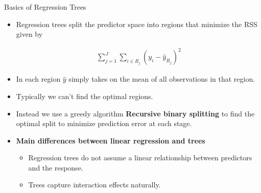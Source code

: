 \documentclass[10pt]{beamer}
\begin{document}
\begin{frame}{Basics of Regression Trees}
    \begin{itemize}
        \item Regression trees split the predictor space into regions that minimize the RSS given by

              \begin{align*}
                  \sum_{j=1}^{J} \sum_{i \in R_j} ( y_i- \hat{y}_{R_j} )^2
              \end{align*}


        \item In each region $\hat{y}$ simply takes on the mean of all observations in that region.

        \item Typically we can't find the optimal regions.
        \item Instead we use a greedy algorithm \textbf{Recursive binary splitting} to find the optimal split to minimize prediction error at each stage.

              \vspace{1cm}
        \item \textbf{Main differences between linear regression and trees}
              \begin{itemize}
                  \item Regression trees do not assume a linear relationship between predictors and the response.

                  \item Trees capture interaction effects naturally.
              \end{itemize}

    \end{itemize}
\end{frame}
\end{document}
